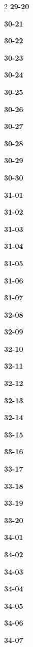 \documentclass[10pt,a4paper]{article}
\begin{document}
\begin{multicols}{2}
\noindent\textbf{29-20}\ \par
\noindent\textbf{30-21}\ \par
\noindent\textbf{30-22}\ \par
\noindent\textbf{30-23}\ \par
\noindent\textbf{30-24}\ \par
\noindent\textbf{30-25}\ \par
\noindent\textbf{30-26}\ \par
\noindent\textbf{30-27}\ \par
\noindent\textbf{30-28}\ \par
\noindent\textbf{30-29}\ \par
\noindent\textbf{30-30}\ \par
\noindent\textbf{31-01}\ \par
\noindent\textbf{31-02}\ \par
\noindent\textbf{31-03}\ \par
\noindent\textbf{31-04}\ \par
\noindent\textbf{31-05}\ \par
\noindent\textbf{31-06}\ \par
\noindent\textbf{31-07}\ \par
\noindent\textbf{32-08}\ \par
\noindent\textbf{32-09}\ \par
\noindent\textbf{32-10}\ \par
\noindent\textbf{32-11}\ \par
\noindent\textbf{32-12}\ \par
\noindent\textbf{32-13}\ \par
\noindent\textbf{32-14}\ \par
\noindent\textbf{33-15}\ \par
\noindent\textbf{33-16}\ \par
\noindent\textbf{33-17}\ \par
\noindent\textbf{33-18}\ \par
\noindent\textbf{33-19}\ \par
\noindent\textbf{33-20}\ \par
\noindent\textbf{34-01}\ \par
\noindent\textbf{34-02}\ \par
\noindent\textbf{34-03}\ \par
\noindent\textbf{34-04}\ \par
\noindent\textbf{34-05}\ \par
\noindent\textbf{34-06}\ \par
\noindent\textbf{34-07}\ \par

\end{multicols}
\end{document}
